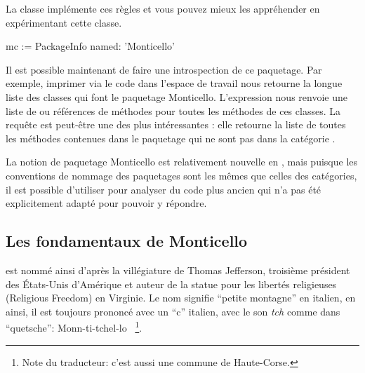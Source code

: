 \documentclass[a4paper,10pt,twoside]{book}
\begin{document}
La classe  implémente ces règles et vous pouvez mieux les 
appréhender en expérimentant cette classe.



\begin{code}{}
mc := PackageInfo named: 'Monticello'
\end{code}

Il est possible maintenant de faire une introspection de ce paquetage.
Par exemple, imprimer via  le code  dans l'espace de travail nous retourne la longue liste des classes qui font le paquetage Monticello. L'expression 
nous renvoie une liste de \mbox{} ou références de méthodes
pour toutes les méthodes de ces classes.
La requête  est peut-être une des plus
intéressantes : elle retourne la liste de toutes les méthodes contenues
dans le paquetage  qui ne sont pas dans la catégorie . 

La notion de paquetage Monticello est relativement nouvelle en \pharo, mais puisque les conventions de nommage des paquetages sont les mêmes que celles des catégories, il est possible d'utiliser
 pour analyser du code plus ancien qui n'a pas 
été explicitement adapté pour pouvoir y répondre.



\subsection{Les fondamentaux de Monticello}

 est nommé ainsi d'après la villégiature 
de Thomas Jefferson, troisième président des États-Unis d'Amérique
et auteur de la statue pour les libertés religieuses (Religious Freedom) en
Virginie. Le nom signifie ``petite montagne'' en italien, en ainsi, il est
toujours prononcé avec un ``c'' italien, \ie avec le son \emph{tch} comme
dans ``quetsche'':
Monn-ti-tchel-lo%
~\footnote{Note du traducteur: c'est aussi une commune de Haute-Corse.}.
\end{document}
